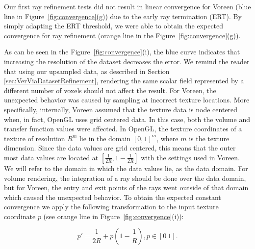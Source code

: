 Our first ray refinement tests did not result in linear convergence
for Voreen (blue line in Figure~\ref{fig:convergence}(g)) due to the
early ray termination (ERT). By simply adapting the ERT threshold, we
were able to obtain the expected convergence for ray refinement
(orange line in the Figure~\ref{fig:convergence}(g)).

As can be seen in the Figure~\ref{fig:convergence}(i), the blue curve
indicates that increasing the resolution of the dataset decreases the
error.  We remind the reader that using our upsampled data, as
described in Section \ref{sec:VerViaDatasetRefinement}, rendering the
same scalar field represented by a different number of voxels should
not affect the result.  For Voreen, the unexpected behavior was caused
by sampling at incorrect texture locations.  More specifically,
internally, Voreen assumed that the texture data is node centered
when, in fact, OpenGL uses grid centered data. In this case, both the
volume and transfer function values were affected. In OpenGL, the
texture coordinates of a texture of resolution $R^m$ lie in the domain
$[0, 1]^m$, where $m$ is the texture dimension. Since the data values
are grid centered, this means that the outer most data values are
located at $[\frac{1}{2R}, 1-\frac{1}{2R}]$ with the settings used in
Voreen.  We will refer to the domain in which the data values lie, as
the data domain.  For volume rendering, the integration of a ray
should be done over the data domain, but for Voreen, the entry and
exit points of the rays went outside of that domain which caused the
unexpected behavior.  To obtain the expected constant convergence we
apply the following transformation to the input texture coordinate $p$
(see orange line in Figure~\ref{fig:convergence}(i)):

\begin{equation}
	p' = \frac{1}{2R} + p\left(1-\frac{1}{R}\right), p \in [0 \  1].
	\label{eq:correct_texture_sampling}
\end{equation}


